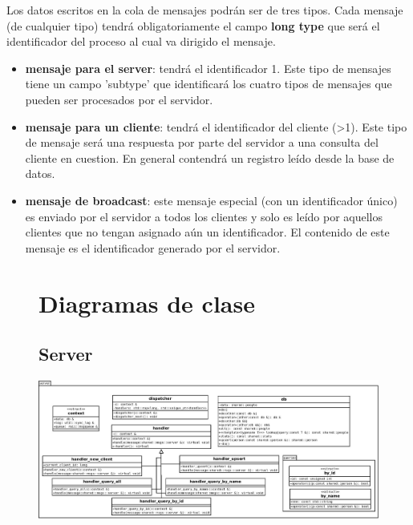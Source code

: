 \documentclass[a4paper,10pt]{article}
\begin{document}
Los datos escritos en la cola de mensajes podrán ser de tres tipos. Cada mensaje (de cualquier tipo) tendrá obligatoriamente el campo \textbf{long type} que será el identificador del proceso al cual va dirigido el mensaje.

\begin{itemize}
\item \textbf{mensaje para el server}: tendrá el identificador 1. Este tipo de mensajes tiene un campo 'subtype' que identificará los cuatro tipos de mensajes que pueden ser procesados por el servidor.

\item \textbf{mensaje para un cliente}: tendrá el identificador del cliente (>1). Este tipo de mensaje será una respuesta por parte del servidor a una consulta del cliente en cuestion. En general contendrá un registro leído desde la base de datos.

\item \textbf{mensaje de broadcast}: este mensaje especial (con un identificador único) es enviado por el servidor a todos los clientes y solo es leído por aquellos clientes que no tengan asignado aún un identificador. El contenido de este mensaje es el identificador generado por el servidor.

\end{itemize}

\clearpage

\begin{figure}
    \section{Diagramas de clase}

	\subsection{Server}
	\begin{center}
        \includegraphics[scale=0.8,angle=90]{server.png}
    \end{center}
\end{figure}
\end{document}
